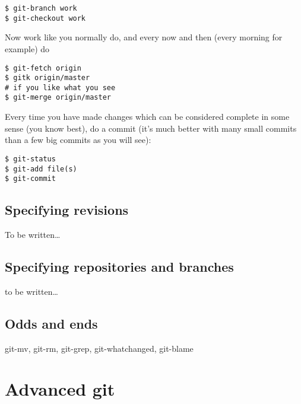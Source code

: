 \documentclass[a4paper,10pt]{article}
\begin{document}
\begin{verbatim}
$ git-branch work
$ git-checkout work 
\end{verbatim}

Now work like you normally do, and every now and then (every morning for
example) do

\begin{verbatim}
$ git-fetch origin
$ gitk origin/master
# if you like what you see
$ git-merge origin/master 
\end{verbatim}

Every time you have made changes which can be considered complete in some
sense (you know best), do a commit (it's much better with many small commits
than a few big commits as you will see):

\begin{verbatim}
$ git-status
$ git-add file(s)
$ git-commit 
\end{verbatim}

\subsection{Specifying revisions}
To be written\ldots

\subsection{Specifying repositories and branches}
to be written\ldots

\subsection{Odds and ends}
git-mv, git-rm, git-grep, git-whatchanged, git-blame

\section{Advanced git}
\end{document}
